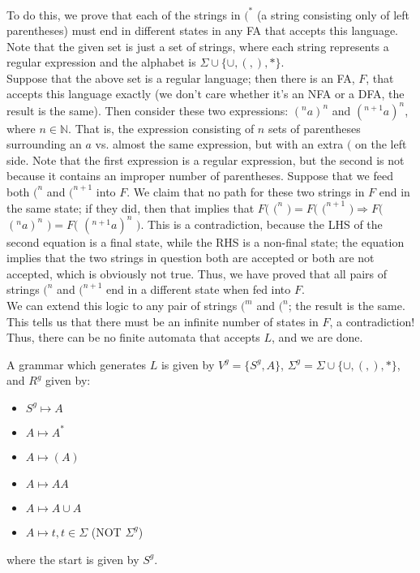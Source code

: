 \documentclass[solution, letterpaper]{cs121}
\begin{document}
\begin{solution}
\subsolution To do this, we prove that each of the strings in $(^*$ (a string consisting only of left parentheses) must end in different states in any FA that accepts this language.  Note that the given set is just a set of strings, where each string represents a regular expression and the alphabet is $\Sigma \cup \{\cup, (, ), *\}$.
\\\indent Suppose that the above set is a regular language; then there is an FA, $F$, that accepts this language exactly (we don't care whether it's an NFA or a DFA, the result is the same).  Then consider these two expressions: $(^na)^n$ and $(^{n+1}a)^n$, where $n \in \mathbb{N}$.  That is, the expression consisting of $n$ sets of parentheses surrounding an $a$ vs. almost the same expression, but with an extra $($ on the left side.  Note that the first expression is a regular expression, but the second is not because it contains an improper number of parentheses.  Suppose that we feed both $(^n$ and $(^{n+1}$ into $F$.  We claim that no path for these two strings in $F$ end in the same state; if they did, then that implies that $F($ $(^n$ $) = F($ $(^{n+1}$ $) \Rightarrow F($ $(^na)^n$ $) = F($ $(^{n+1}a)^n$ $)$.  This is a contradiction, because the LHS of the second equation is a final state, while the RHS is a non-final state; the equation implies that the two strings in question both are accepted or both are not accepted, which is obviously not true.  Thus, we have proved that all pairs of strings $(^n$ and $(^{n+1}$ end in a different state when fed into $F$.
\\\indent We can extend this logic to any pair of strings $(^m$ and $(^n$; the result is the same.  This tells us that there must be an infinite number of states in $F$, a contradiction!  Thus, there can be no finite automata that accepts $L$, and we are done.

\subsolution A grammar which generates $L$ is given by $V^g = \{S^g, A\}$, $\Sigma^g = \Sigma \cup \{\cup, (, ), *\}$, and $R^g$ given by:
\begin{itemize}
	\setlength\itemsep{0pt}
	\item $S^g \mapsto A$
	\item $A \mapsto A^*$
	\item $A \mapsto (A)$
	\item $A \mapsto AA$
	\item $A \mapsto A \cup A$
	\item $A \mapsto t, t \in \Sigma$ (NOT $\Sigma^g$)
\end{itemize}
where the start is given by $S^g$.
\end{solution}
\end{document}

